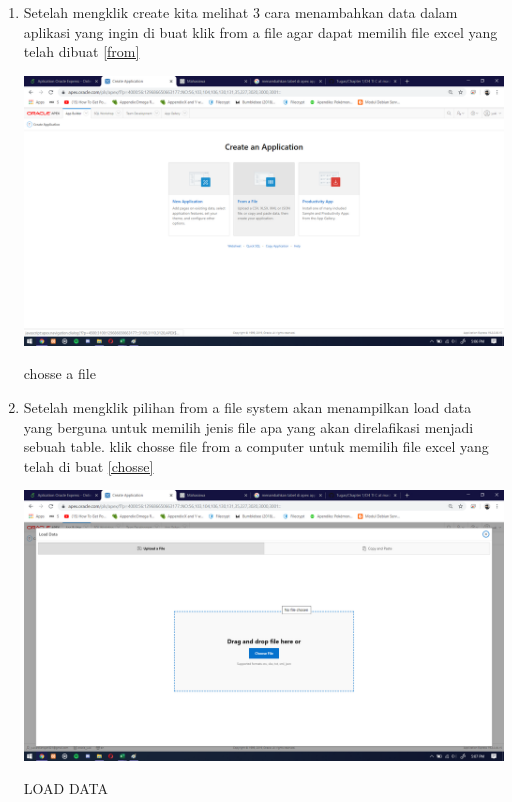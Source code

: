 \documentclass{article}
\begin{document}
\begin{enumerate}
      \item Setelah mengklik create kita melihat 3 cara menambahkan data dalam aplikasi yang ingin di buat klik from a file agar dapat memilih file excel yang telah dibuat
      \ref{from}
    \begin{center}
         \centering
            \includegraphics[scale=0.27]{figures/DB2.png}
        \caption{chosse a file}
        \label{from}
    \end{center}
    
    \item Setelah mengklik pilihan from a file system akan menampilkan load data yang berguna untuk memilih jenis file apa yang akan direlafikasi menjadi sebuah table. klik chosse file from a computer untuk memilih file excel yang telah di buat
      \ref{chosse}
    \begin{center}
         \centering
            \includegraphics[scale=0.27]{figures/DB3.png}
        \caption{LOAD DATA}
        \label{chosse}
    \end{center}
    

\end{enumerate}
\end{document}
